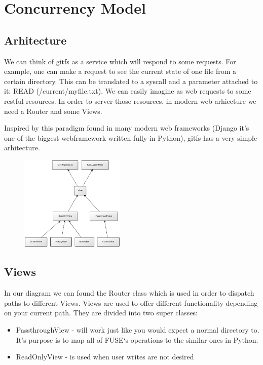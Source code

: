 \chapter{Concurrency Model}

\label{ch:concurrencymodel}

\section{Arhitecture}
   We can think of gitfs as a service which will respond to some requests. For example, one can make a request to see the current state of one file from a certain directory. This can be translated to a syscall and a parameter attached to it: READ (/current/myfile.txt). We can easily imagine as web requests to some restful resources. In order to server those resources, in modern web arhiecture we need a Router and some Views.
   
   Inspired by this paradigm found in many modern web frameworks (Django it's one of the biggest webframework written fully in Python), gitfs has a very simple arhitecture.
   
   \begin{figure}[h]
      \begin{center}
        \includegraphics[width=5cm]{concurrency/views-gitfs.png}
      \end{center}
   \end{figure}
   
\section{Views}
In our diagram we can found the Router class which is used in order to dispatch paths to different Views.
Views are used to offer different functionality depending on your current path.
They are divided into two super classes:

\begin{itemize}
    \item PassthroughView - will work just like you would expect a normal directory to. It’s purpose is to map all of FUSE‘s operations to the similar ones in Python.
    
    \item ReadOnlyView - is used when user writes are not desired
\end{itemize}

